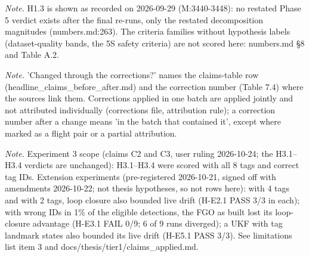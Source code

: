 \begin{table}[htbp]
\textit{Note.} H1.3 is shown as recorded on 2026-09-29 (M:3440-3448): no restated Phase 5 verdict exists after the final re-runs, only the restated decomposition magnitudes (numbers.md:263). The criteria families without hypothesis labels (dataset-quality bands, the 5S safety criteria) are not scored here: numbers.md \S{}8 and Table A.2.\par
\textit{Note.} 'Changed through the corrections?' names the claims-table row (headline\_claims\_before\_after.md) and the correction number (Table 7.4) where the sources link them. Corrections applied in one batch are applied jointly and not attributed individually (corrections file, attribution rule); a correction number after a change means 'in the batch that contained it', except where marked as a flight pair or a partial attribution.\par
\textit{Note.} Experiment 3 scope (claims C2 and C3, user ruling 2026-10-24; the H3.1--H3.4 verdicts are unchanged): H3.1--H3.4 were scored with all 8 tags and correct tag IDs. Extension experiments (pre-registered 2026-10-21, signed off with amendments 2026-10-22; not thesis hypotheses, so not rows here): with 4 tags and with 2 tags, loop closure also bounded live drift (H-E2.1 PASS 3/3 in each); with wrong IDs in 1\% of the eligible detections, the FGO as built lost its loop-closure advantage (H-E3.1 FAIL 0/9; 6 of 9 runs diverged); a UKF with tag landmark states also bounded its live drift (H-E5.1 PASS 3/3). See limitations list item 3 and docs/thesis/tier1/claims\_applied.md.\par
\end{table}

